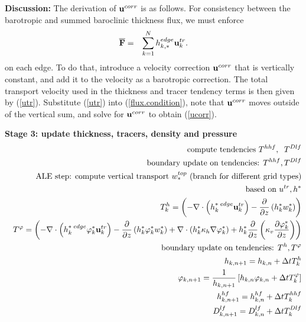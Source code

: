 \documentclass[11pt]{report}
\newcommand{\bea}{\begin{eqnarray}}
\newcommand{\eea}{\end{eqnarray}}
\begin{document}
{\bf Discussion:} The derivation of ${\bf u}^{corr}$ is as follows.  For consistency between the barotropic and summed baroclinic thickness flux,  we must enforce
\begin{eqnarray}
{\overline {\bf F}} &=& \sum_{k=1}^N h_{k,*}^{edge} {\bf u}_k^{tr}. \label{flux.condition}
\label{BclBtrFluxConsistency}
\end{eqnarray}
on each edge.  To do that, introduce a velocity correction ${\bf u}^{corr}$ that is vertically constant, and add it to the velocity as a barotropic correction.  The total transport velocity used in the thickness and tracer tendency terms is then given by (\ref{utr}).  Substitute (\ref{utr}) into (\ref{flux.condition}), note that ${\bf u}^{corr}$ moves outside of the vertical sum, and solve for ${\bf u}^{corr}$ to obtain (\ref{ucorr}).

\newpage
{\bf Stage 3: update thickness, tracers, density and pressure}
\bea &&
\mbox{compute tendencies } 
T^{hhf}, \;\;
T^{Dlf} \\ && 
\mbox{boundary update on tendencies: } T^{hhf},T^{Dlf}\\&& 
\mbox{ALE step: compute vertical transport $w^{top}_*$} 
\mbox{ (branch for different grid types)}\\ &&
\mbox{     based on } u^{tr}, h^* \\ &&
T^h_k = \left(  - \nabla \cdot \left( h_k^{*\; edge} {\bf u}_k^{tr} \right)  
- \frac{\partial}{\partial z} \left( h_k^* w_k^* \right)  \right)
\\ && 
T^\varphi %
= \left(  - \nabla \cdot \left( h_k^{*\; edge}\varphi_k^* {\bf u}_k^{tr} \right)  
- \frac{\partial}{\partial z} \left( h_k^*\varphi_k^* w_k^* \right)  
+ \nabla\cdot\left(h_k^* \kappa_h \nabla\varphi_k^* \right)
+ h_k^* \frac{\partial }{\partial z} 
  \left( \kappa_v \frac{\partial \varphi_k^*}{\partial z} \right)
\right) 
\\ &&
\mbox{boundary update on tendencies: } T^h,T^\varphi\\&& 
h_{k,n+1} = h_{k,n} +  \Delta t T^h_k \\&& 
\label{phi3}
{\varphi}_{k,n+1} = \frac{1}{h_{k,n+1}} \left[
h_{k,n} \varphi_{k,n} 
+ \Delta t T^\varphi_k \right]
\label{phi}
\\&&
h^{hf}_{k,n+1} = h^{hf}_{k,n} + \Delta t T^{hhf}_k \\ &&
D^{lf}_{k,n+1} = D^{lf}_{k,n} + \Delta t T^{Dlf}_k 
\eea
\end{document}
